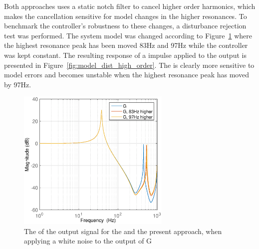 Both approaches uses a static notch filter to cancel higher order harmonics, which makes the cancellation sensitive for model changes in the higher resonances. To benchmark the controller's robustness to these changes, a disturbance rejection test was performed. The system model was changed according to Figure~\ref{fig:high_model_error} where the highest resonance peak has been moved 83Hz and 97Hz while the controller was kept constant. The resulting response of a impulse applied to the output is presented in Figure~\ref{fig:model_dist_high_order}. The \abbrIRC is clearly more sensitive to model errors and becomes unstable when the highest resonance peak has moved by 97Hz.

\begin{figure}[h!]
  \centering
  \includegraphics[width=0.65\textwidth]{fig/matlab/bode_high_model_error.eps}
  \caption{\label{fig:high_model_error} The \abbrFFT of the output signal for the \abbrIRC and the present approach, when applying a white noise to the output of G}
\end{figure}

